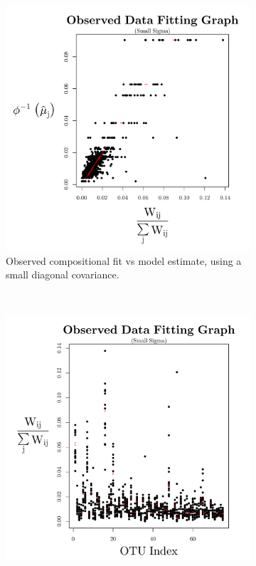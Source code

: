 \documentclass{template}
\begin{document}
\begin{figure}[ht!]
    \centering
    \begin{subfigure}[b]{0.38\textheight}
        \includegraphics[width=\textwidth]{Images/XiaPlotBars11small.pdf}
        \caption{Observed compositional fit vs model estimate, using a small diagonal covariance.}
    \end{subfigure}
\\
    \begin{subfigure}[b]{0.38\textheight}
        \includegraphics[width=\textwidth]{Images/XiaPlotBars11smallT.pdf}

\end{subfigure}
\end{figure}
\end{document}

